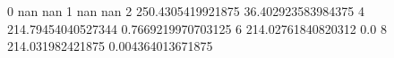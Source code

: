 0 nan nan
1 nan nan
2 250.4305419921875 36.402923583984375
4 214.79454040527344 0.7669219970703125
6 214.02761840820312 0.0
8 214.031982421875 0.004364013671875
